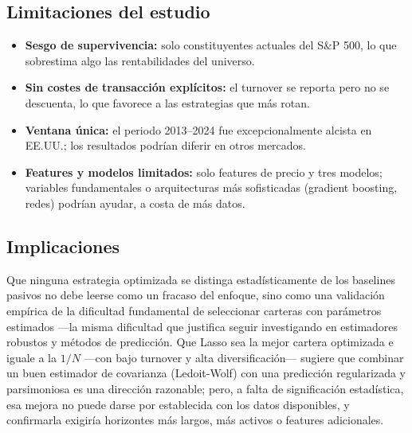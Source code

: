 \subsection{Limitaciones del estudio}

\begin{itemize}
    \item \textbf{Sesgo de supervivencia:} solo constituyentes actuales del
          S\&P 500, lo que sobrestima algo las rentabilidades del universo.
    \item \textbf{Sin costes de transacción explícitos:} el turnover se
          reporta pero no se descuenta, lo que favorece a las estrategias que
          más rotan.
    \item \textbf{Ventana única:} el periodo 2013--2024 fue excepcionalmente
          alcista en EE.UU.; los resultados podrían diferir en otros mercados.
    \item \textbf{Features y modelos limitados:} solo features de precio y tres
          modelos; variables fundamentales o arquitecturas más sofisticadas
          (gradient boosting, redes) podrían ayudar, a costa de más datos.
\end{itemize}

\subsection{Implicaciones}

Que ninguna estrategia optimizada se distinga estadísticamente de los baselines
pasivos no debe leerse como un fracaso del enfoque, sino como una validación
empírica de la dificultad fundamental de seleccionar carteras con parámetros
estimados ---la misma dificultad que justifica seguir investigando en
estimadores robustos y métodos de predicción. Que Lasso sea la mejor cartera
optimizada e iguale a la $1/N$ ---con bajo turnover y alta diversificación---
sugiere que combinar un buen estimador de covarianza (Ledoit-Wolf) con una
predicción regularizada y parsimoniosa es una dirección razonable; pero, a falta
de significación estadística, esa mejora no puede darse por establecida con los
datos disponibles, y confirmarla exigiría horizontes más largos, más activos o
features adicionales.

